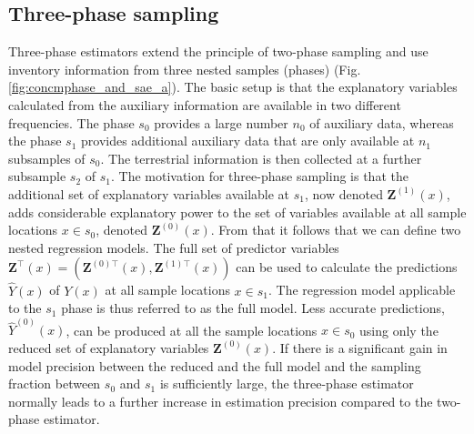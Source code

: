 \documentclass[article]{jss}
\begin{document}
\subsection{Three-phase sampling}

Three-phase estimators extend the principle of two-phase sampling and use inventory information from three nested samples (phases) (Fig. \ref{fig:concmphase_and_sae_a}). The basic setup is that the explanatory variables calculated from the auxiliary information are available in two different frequencies. The phase $s_0$ provides a large number $n_0$ of auxiliary data, whereas the phase $s_1$ provides additional auxiliary data that are only available at $n_1$ subsamples of $s_0$. The terrestrial information is then collected at a further subsample $s_2$ of $s_1$. The motivation for three-phase sampling is that the additional set of explanatory variables available at $s_1$, now denoted $\pmb{Z}^{(1)}(x)$, adds considerable explanatory power to the set of variables available at all sample locations $x \in s_0$, denoted $\pmb{Z}^{(0)}(x)$. From that it follows that we can define two nested regression models. The full set of predictor variables $\pmb{Z}^{\top}(x)=(\pmb{Z}^{(0){\top}}(x),\pmb{Z}^{(1){\top}}(x))$ can be used to calculate the predictions $\hat{Y}(x)$ of $Y(x)$ at all sample locations $x \in s_1$. The regression model applicable to the $s_1$ phase is thus referred to as the full model. Less accurate predictions, $\hat{Y}^{(0)}(x)$, can be produced at all the sample locations $x \in s_0$ using only the reduced set of explanatory variables $\pmb{Z}^{(0)}(x)$. If there is a significant gain in model precision between the reduced and the full model and the sampling fraction between $s_0$ and $s_1$ is sufficiently large, the three-phase estimator normally leads to a further increase in estimation precision compared to the two-phase estimator. 
\end{document}

